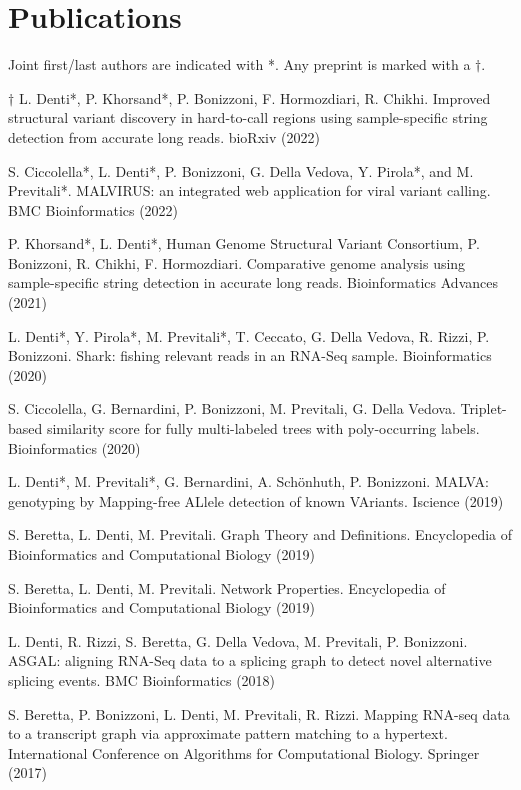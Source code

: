 \documentclass[letterpaper,11pt]{article}
\begin{document}
\section{Publications}
Joint first/last authors are indicated with *. Any preprint is marked with a \(\dagger\).
{\small
\begin{etaremune}
    \item \(\dagger\) L. Denti*, P. Khorsand*, P. Bonizzoni, F. Hormozdiari, R. Chikhi. Improved structural variant discovery in hard-to-call regions using sample-specific string detection from accurate long reads. bioRxiv (2022)
    
    \item S. Ciccolella*, L. Denti*, P. Bonizzoni, G. Della Vedova, Y. Pirola*, and M. Previtali*. MALVIRUS: an integrated web application for viral variant calling. BMC Bioinformatics (2022)

    \item P. Khorsand*, L. Denti*, Human Genome Structural Variant Consortium, P. Bonizzoni, R. Chikhi, F. Hormozdiari. Comparative genome analysis using sample-specific string detection in accurate long reads. Bioinformatics Advances (2021)

    \item L. Denti*, Y. Pirola*, M. Previtali*, T. Ceccato, G. Della Vedova, R. Rizzi, P. Bonizzoni. Shark: fishing relevant reads in an RNA-Seq sample. Bioinformatics (2020)
   
    \item S. Ciccolella, G. Bernardini, P. Bonizzoni, M. Previtali, G. Della Vedova. Triplet-based similarity score for fully multi-labeled trees with poly-occurring labels. Bioinformatics (2020)
   
    \item L. Denti*, M. Previtali*, G. Bernardini, A. Sch\"{o}nhuth, P. Bonizzoni. MALVA: genotyping by Mapping-free ALlele detection of known VAriants. Iscience (2019)
   
    \item S. Beretta, L. Denti, M. Previtali. Graph Theory and Definitions. Encyclopedia of Bioinformatics and Computational Biology (2019)
   
    \item S. Beretta, L. Denti, M. Previtali. Network Properties. Encyclopedia of Bioinformatics and Computational Biology (2019)
   
    \item L. Denti, R. Rizzi, S. Beretta, G. Della Vedova, M. Previtali, P. Bonizzoni. ASGAL: aligning RNA-Seq data to a splicing graph to detect novel alternative splicing events. BMC Bioinformatics (2018)
    
    \item S. Beretta, P. Bonizzoni, L. Denti, M. Previtali, R. Rizzi. Mapping RNA-seq data to a transcript graph via approximate pattern matching to a hypertext. International Conference on Algorithms for Computational Biology. Springer (2017)
\end{etaremune}
}
\end{document}
